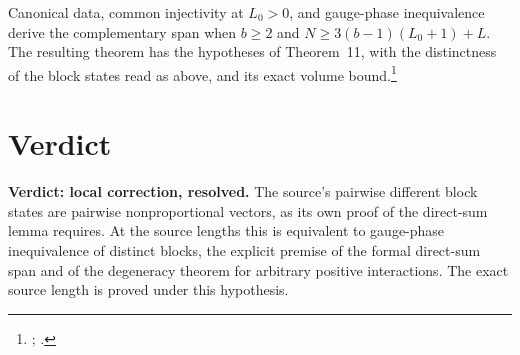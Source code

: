 \documentclass{article}
\begin{document}
Canonical data, common injectivity at $L_0>0$, and gauge-phase inequivalence
derive the complementary span when $b\ge2$ and $N\ge3(b-1)(L_0+1)+L$. The
resulting theorem has the hypotheses of Theorem~11, with the distinctness of the
block states read as above, and its exact volume bound.\footnote{%
    ;
    .}

\section{Verdict}

\textbf{Verdict: local correction, resolved.} The source's pairwise different
block states are pairwise nonproportional vectors, as its own proof of the
direct-sum lemma requires. At the source lengths this is equivalent to
gauge-phase inequivalence of distinct blocks, the explicit premise of the formal
direct-sum span and of the degeneracy theorem for arbitrary positive
interactions. The exact source length is proved under this hypothesis.



\end{document}
